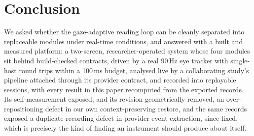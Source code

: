 \section{Conclusion}
\label{sec:conclusion}

We asked whether the gaze-adaptive reading loop can be cleanly separated into replaceable modules under real-time conditions, and answered with a built and measured platform: a two-screen, researcher-operated system whose four modules sit behind build-checked contracts, driven by a real 90\,Hz eye tracker with single-host round trips within a 100\,ms budget, analysed live by a collaborating study's pipeline attached through its provider contract, and recorded into replayable sessions, with every result in this paper recomputed from the exported records.
Its self-measurement exposed, and its revision geometrically removed, an over-repositioning defect in our own context-preserving restore, and the same records exposed a duplicate-recording defect in provider event extraction, since fixed, which is precisely the kind of finding an instrument should produce about itself.
